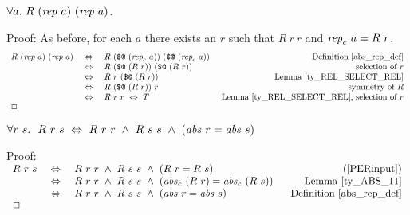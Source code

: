 \documentclass[envcountsame,runningheads]{llncs}
\begin{document}
\begin{theorem}
\label{rep_respects}
$\forall a.\ R\ ({\it rep}\ a)\ ({\it rep}\ a)$.
\end{theorem}
Proof:
As before,
for each $a$
there exists an $r$ such that
$R\ r\ r$ and ${\it rep}_c\ a = R\ r$.
%
$$
\begin{array}[t]{rcl@{\hspace{0.5cm}}r}
R\ (\mbox{\it rep}\ a)\ (\mbox{\it rep}\ a)
& \ \Leftrightarrow \ &
R\ (\mbox{\tt \$@}\ (\mbox{\it rep}_c\ a))\ (\mbox{\tt \$@}\ (\mbox{\it rep}_c\ a))
& \mbox{Definition \ref{abs_rep_def}}  \\
& \ \Leftrightarrow \ &
R\ (\mbox{\tt \$@}\ (R\ r))\ (\mbox{\tt \$@}\ (R\ r))
& \mbox{selection of $r$}  \\
& \ \Leftrightarrow \ &
R\ r\ (\mbox{\tt \$@}\ (R\ r))
& \mbox{Lemma \ref{ty_REL_SELECT_REL}}  \\
& \ \Leftrightarrow \ &
R\ (\mbox{\tt \$@}\ (R\ r))\ r
& \mbox{symmetry of $R$}  \\
& \ \Leftrightarrow \ &
R\ r\ r \ \Leftrightarrow \ T
& \mbox{Lemma \ref{ty_REL_SELECT_REL}, selection of $r$}  \\
\Box \hfill & & &
\end{array}
$$

\begin{theorem}
\label{equiv_ty_ABS}
$\forall r\ s.\ \ R\ r\ s \ \Leftrightarrow \
R\ r\ r\ \wedge \ R\ s\ s\ \wedge \
({\it abs}\ r = {\it abs}\ s)$
\end{theorem}
Proof:
$
\begin{array}[t]{rcl@{\hspace{0.6cm}}r}
R\ r\ s
& \ \Leftrightarrow \ &
R\ r\ r \ \wedge\ R\ s\ s \ \wedge\ (R\ r = R\ s)
& \mbox{(\ref{PERinput})}  \\
& \ \Leftrightarrow \ &
R\ r\ r \ \wedge\ R\ s\ s \ \wedge\
({\it abs}_c\ (R\ r) = {\it abs}_c\ (R\ s))
& \mbox{Lemma \ref{ty_ABS_11}}  \\
& \ \Leftrightarrow \ &
R\ r\ r \ \wedge\ R\ s\ s \ \wedge\
({\it abs}\ r = {\it abs}\ s)
& \mbox{Definition \ref{abs_rep_def}}  \\
\Box \hfill & & &
\end{array}
$
\end{document}
